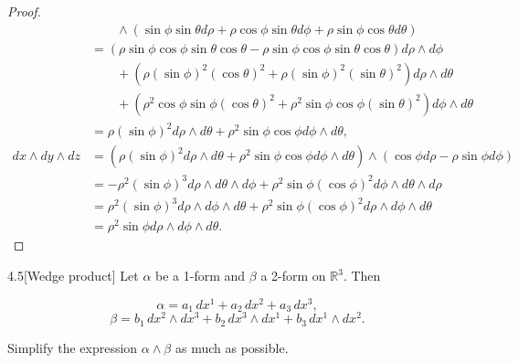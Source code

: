 \begin{proof}
\begin{align*}
                               & \qquad \wedge (\sin\phi\sin\theta d\rho + \rho\cos\phi\sin\theta d\phi + \rho\sin\phi\cos\theta d\theta)                                                                                                               \\
                               & = (\rho \sin\phi\cos\phi\sin\theta\cos\theta - \rho\sin\phi\cos\phi\sin\theta\cos\theta) d\rho \wedge d\phi                                                                                                            \\
                               & \qquad + (\rho{(\sin\phi)}^{2}{(\cos\theta)}^{2} + \rho{(\sin\phi)}^{2}{(\sin\theta)}^{2}) d\rho \wedge d\theta                                                                                                        \\
                               & \qquad + (\rho^{2}\cos\phi\sin\phi{(\cos\theta)}^{2} + \rho^{2}\sin\phi\cos\phi{(\sin\theta)}^{2}) d\phi \wedge d\theta                                                                                                \\
                               & = \rho {(\sin\phi)}^{2} d\rho \wedge d\theta + \rho^{2}\sin\phi\cos\phi d\phi \wedge d\theta,                                                                                                                          \\
        dx \wedge dy \wedge dz & = (\rho {(\sin\phi)}^{2} d\rho \wedge d\theta + \rho^{2}\sin\phi\cos\phi d\phi \wedge d\theta) \wedge (\cos\phi d\rho - \rho\sin\phi d\phi)                                                                            \\
                               & = -\rho^{2}{(\sin\phi)}^{3}d\rho \wedge d\theta \wedge d\phi + \rho^{2}\sin\phi{(\cos\phi)}^{2} d\phi \wedge d\theta \wedge d\rho                                                                                      \\
                               & = \rho^{2}{(\sin\phi)}^{3} d\rho \wedge d\phi \wedge d\theta + \rho^{2}\sin\phi {(\cos\phi)}^{2}d\rho \wedge d\phi \wedge d\theta                                                                                      \\
                               & = \rho^{2} \sin\phi d\rho \wedge d\phi \wedge d\theta.
    \end{align*}
    \endgroup
\end{proof}

\begin{problem}{4.5}[Wedge product]
Let \(\alpha\) be a 1-form and \(\beta\) a 2-form on \(\mathbb{R}^{3}\). Then

\[
    \alpha = a_{1}\,dx^{1} + a_{2}\,dx^{2} + a_{3}\,dx^{3},
\]
\[
    \beta = b_{1}\,dx^{2} \wedge dx^{3} + b_{2}\,dx^{3} \wedge dx^{1} + b_{3}\,dx^{1} \wedge dx^{2}.
\]

Simplify the expression \(\alpha \wedge \beta\) as much as possible.
\end{problem}

